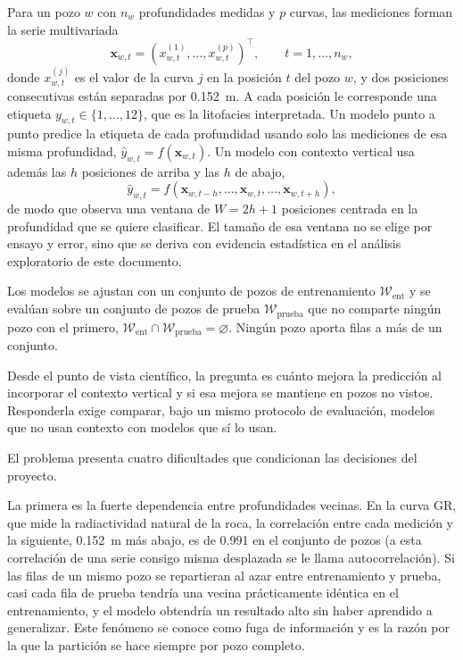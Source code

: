 \documentclass[11pt,a4paper]{article}
\begin{document}
Para un pozo $w$ con $n_w$ profundidades medidas y $p$ curvas, las mediciones forman la serie multivariada
\begin{equation}
\mathbf{x}_{w,t} = \left(x_{w,t}^{(1)}, \dots, x_{w,t}^{(p)}\right)^{\top}, \qquad t = 1, \dots, n_w ,
\end{equation}
donde $x_{w,t}^{(j)}$ es el valor de la curva $j$ en la posición $t$ del pozo $w$, y dos posiciones consecutivas están separadas por 0.152~m. A cada posición le corresponde una etiqueta $y_{w,t} \in \{1, \dots, 12\}$, que es la litofacies interpretada. Un modelo punto a punto predice la etiqueta de cada profundidad usando solo las mediciones de esa misma profundidad, $\hat{y}_{w,t} = f(\mathbf{x}_{w,t})$. Un modelo con contexto vertical usa además las $h$ posiciones de arriba y las $h$ de abajo,
\begin{equation}
\hat{y}_{w,t} = f\left(\mathbf{x}_{w,t-h}, \dots, \mathbf{x}_{w,t}, \dots, \mathbf{x}_{w,t+h}\right),
\end{equation}
de modo que observa una ventana de $W = 2h + 1$ posiciones centrada en la profundidad que se quiere clasificar. El tamaño de esa ventana no se elige por ensayo y error, sino que se deriva con evidencia estadística en el análisis exploratorio de este documento.

Los modelos se ajustan con un conjunto de pozos de entrenamiento $\mathcal{W}_{\text{ent}}$ y se evalúan sobre un conjunto de pozos de prueba $\mathcal{W}_{\text{prueba}}$ que no comparte ningún pozo con el primero, $\mathcal{W}_{\text{ent}} \cap \mathcal{W}_{\text{prueba}} = \varnothing$. Ningún pozo aporta filas a más de un conjunto.

Desde el punto de vista científico, la pregunta es cuánto mejora la predicción al incorporar el contexto vertical y si esa mejora se mantiene en pozos no vistos. Responderla exige comparar, bajo un mismo protocolo de evaluación, modelos que no usan contexto con modelos que sí lo usan.

El problema presenta cuatro dificultades que condicionan las decisiones del proyecto.

La primera es la fuerte dependencia entre profundidades vecinas. En la curva GR, que mide la radiactividad natural de la roca, la correlación entre cada medición y la siguiente, 0.152~m más abajo, es de 0.991 en el conjunto de pozos (a esta correlación de una serie consigo misma desplazada se le llama autocorrelación). Si las filas de un mismo pozo se repartieran al azar entre entrenamiento y prueba, casi cada fila de prueba tendría una vecina prácticamente idéntica en el entrenamiento, y el modelo obtendría un resultado alto sin haber aprendido a generalizar. Este fenómeno se conoce como fuga de información y es la razón por la que la partición se hace siempre por pozo completo.
\end{document}
